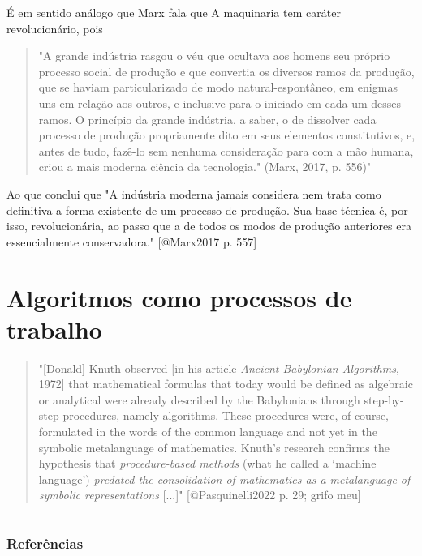 \documentclass[
]{article}
\begin{document}
É em sentido análogo que Marx fala que A maquinaria tem caráter
revolucionário, pois

\begin{quote}
"A grande indústria rasgou o véu que ocultava aos homens seu próprio
processo social de produção e que convertia os diversos ramos da
produção, que se haviam particularizado de modo natural-espontâneo, em
enigmas uns em relação aos outros, e inclusive para o iniciado em cada
um desses ramos. O princípio da grande indústria, a saber, o de
dissolver cada processo de produção propriamente dito em seus elementos
constitutivos, e, antes de tudo, fazê-lo sem nenhuma consideração para
com a mão humana, criou a mais moderna ciência da tecnologia." (Marx,
2017, p. 556)"
\end{quote}

Ao que conclui que "A indústria moderna jamais considera nem trata como
definitiva a forma existente de um processo de produção. Sua base
técnica é, por isso, revolucionária, ao passo que a de todos os modos de
produção anteriores era essencialmente conservadora." {[}@Marx2017 p.
557{]}

\section{Algoritmos como processos de
trabalho}\label{algoritmos-como-processos-de-trabalho}

\begin{quote}
"{[}Donald{]} Knuth observed {[}in his article \emph{Ancient Babylonian
Algorithms}, 1972{]} that mathematical formulas that today would be
defined as algebraic or analytical were already described by the
Babylonians through step-by-step procedures, namely algorithms. These
procedures were, of course, formulated in the words of the common
language and not yet in the symbolic metalanguage of mathematics.
Knuth's research confirms the hypothesis that \emph{procedure-based
methods} (what he called a `machine language') \emph{predated the
consolidation of mathematics as a metalanguage of symbolic
representations} {[}...{]}" {[}@Pasquinelli2022 p. 29; grifo meu{]}
\end{quote}

\begin{center}\rule{0.5\linewidth}{0.5pt}\end{center}

\subsubsection{Referências}\label{referuxeancias}
\end{document}
